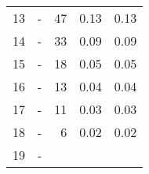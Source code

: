 \begin{longtable}{lXrrr}
     13 &
     \multicolumn{1}{X}{ -  } &


       \num{47} &
       \num[round-mode=places,round-precision=2]{0,13} &
         \num[round-mode=places,round-precision=2]{0,13} \\

     14 &
     \multicolumn{1}{X}{ -  } &


       \num{33} &
       \num[round-mode=places,round-precision=2]{0,09} &
         \num[round-mode=places,round-precision=2]{0,09} \\

     15 &
     \multicolumn{1}{X}{ -  } &


       \num{18} &
       \num[round-mode=places,round-precision=2]{0,05} &
         \num[round-mode=places,round-precision=2]{0,05} \\

     16 &
     \multicolumn{1}{X}{ -  } &


       \num{13} &
       \num[round-mode=places,round-precision=2]{0,04} &
         \num[round-mode=places,round-precision=2]{0,04} \\

     17 &
     \multicolumn{1}{X}{ -  } &


       \num{11} &
       \num[round-mode=places,round-precision=2]{0,03} &
         \num[round-mode=places,round-precision=2]{0,03} \\

     18 &
     \multicolumn{1}{X}{ -  } &


       \num{6} &
       \num[round-mode=places,round-precision=2]{0,02} &
         \num[round-mode=places,round-precision=2]{0,02} \\

     19 &
     \multicolumn{1}{X}{ -  } &



\end{longtable}
